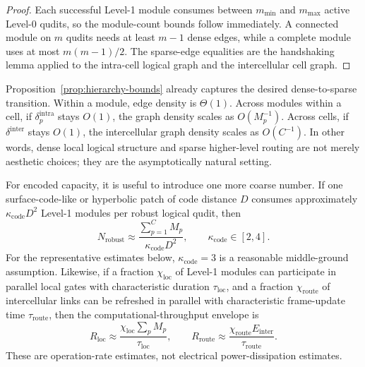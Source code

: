 \documentclass[11pt]{report}
\theoremstyle{definition}
\begin{document}
\begin{proof}
Each successful Level-1 module consumes between $m_{\min}$ and $m_{\max}$ active Level-0 qudits, so the module-count bounds follow immediately. A connected module on $m$ qudits needs at least $m-1$ dense edges, while a complete module uses at most $m(m-1)/2$. The sparse-edge equalities are the handshaking lemma applied to the intra-cell logical graph and the intercellular cell graph.
\end{proof}

Proposition~\ref{prop:hierarchy-bounds} already captures the desired dense-to-sparse transition. Within a module, edge density is $\Theta(1)$. Across modules within a cell, if $\delta^{\mathrm{intra}}_p$ stays $O(1)$, the graph density scales as $O(M_p^{-1})$. Across cells, if $\delta^{\mathrm{inter}}$ stays $O(1)$, the intercellular graph density scales as $O(C^{-1})$. In other words, dense local logical structure and sparse higher-level routing are not merely aesthetic choices; they are the asymptotically natural setting.

For encoded capacity, it is useful to introduce one more coarse number. If one surface-code-like or hyperbolic patch of code distance $D$ consumes approximately $\kappa_{\mathrm{code}}D^2$ Level-1 modules per robust logical qudit, then
\begin{equation}
N_{\mathrm{robust}}
\approx
\frac{\sum_{p=1}^{C} M_p}{\kappa_{\mathrm{code}}D^2},
\qquad
\kappa_{\mathrm{code}}\in[2,4].
\label{eq:Nrobust}
\end{equation}
For the representative estimates below, $\kappa_{\mathrm{code}}=3$ is a reasonable middle-ground assumption. Likewise, if a fraction $\chi_{\mathrm{loc}}$ of Level-1 modules can participate in parallel local gates with characteristic duration $\tau_{\mathrm{loc}}$, and a fraction $\chi_{\mathrm{route}}$ of intercellular links can be refreshed in parallel with characteristic frame-update time $\tau_{\mathrm{route}}$, then the computational-throughput envelope is
\begin{equation}
R_{\mathrm{loc}}
\approx
\frac{\chi_{\mathrm{loc}}\sum_p M_p}{\tau_{\mathrm{loc}}},
\qquad
R_{\mathrm{route}}
\approx
\frac{\chi_{\mathrm{route}}E_{\mathrm{inter}}}{\tau_{\mathrm{route}}}.
\label{eq:Rloc-Rroute}
\end{equation}
These are operation-rate estimates, not electrical power-dissipation estimates.
\end{document}
